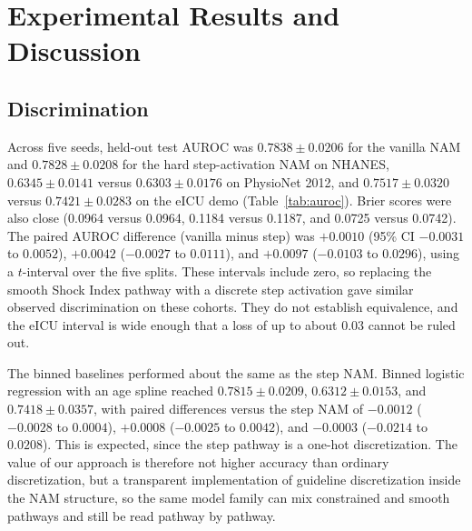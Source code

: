 \documentclass[conference]{IEEEtran}
\begin{document}
\section{Experimental Results and Discussion}

\subsection{Discrimination}
Across five seeds, held-out test AUROC was $0.7838\pm0.0206$ for the vanilla NAM and $0.7828\pm0.0208$ for the hard step-activation NAM on NHANES, $0.6345\pm0.0141$ versus $0.6303\pm0.0176$ on PhysioNet 2012, and $0.7517\pm0.0320$ versus $0.7421\pm0.0283$ on the eICU demo (Table~\ref{tab:auroc}). Brier scores were also close (0.0964 versus 0.0964, 0.1184 versus 0.1187, and 0.0725 versus 0.0742). The paired AUROC difference (vanilla minus step) was $+0.0010$ (95\% CI $-0.0031$ to $0.0052$), $+0.0042$ ($-0.0027$ to $0.0111$), and $+0.0097$ ($-0.0103$ to $0.0296$), using a $t$-interval over the five splits. These intervals include zero, so replacing the smooth Shock Index pathway with a discrete step activation gave similar observed discrimination on these cohorts. They do not establish equivalence, and the eICU interval is wide enough that a loss of up to about 0.03 cannot be ruled out.

The binned baselines performed about the same as the step NAM. Binned logistic regression with an age spline reached $0.7815\pm0.0209$, $0.6312\pm0.0153$, and $0.7418\pm0.0357$, with paired differences versus the step NAM of $-0.0012$ ($-0.0028$ to $0.0004$), $+0.0008$ ($-0.0025$ to $0.0042$), and $-0.0003$ ($-0.0214$ to $0.0208$). This is expected, since the step pathway is a one-hot discretization. The value of our approach is therefore not higher accuracy than ordinary discretization, but a transparent implementation of guideline discretization inside the NAM structure, so the same model family can mix constrained and smooth pathways and still be read pathway by pathway.
\end{document}
